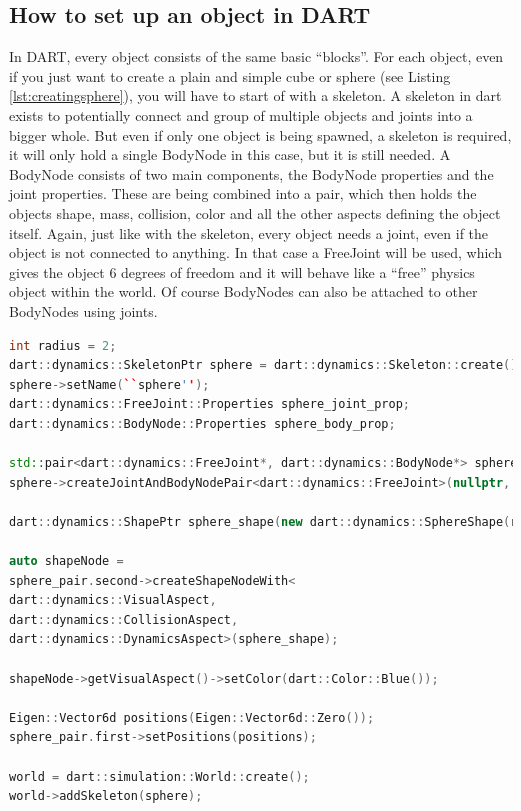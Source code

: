 \documentclass[12pt,oneside,listof=totoc,paper=a4,headings=small]{scrbook}
\begin{document}
\subsection{How to set up an object in DART}
In DART, every object consists of the same basic ``blocks''. For each object, even if you just want to create a plain and simple cube or sphere (see Listing \ref{lst:creatingsphere}), you will have to start of with a skeleton. A skeleton in dart exists to potentially connect and group of multiple objects and joints into a bigger whole. But even if only one object is being spawned, a skeleton is required, it will only hold a single BodyNode in this case, but it is still needed. 
A BodyNode consists of two main components, the BodyNode properties and the joint properties. These are being combined into a pair, which then holds the objects shape, mass, collision, color and all the other aspects defining the object itself. Again, just like with the skeleton, every object needs a joint, even if the object is not connected to anything. In that case a FreeJoint will be used, which gives the object 6 degrees of freedom and it will behave like a ``free'' physics object within the world. 
Of course BodyNodes can also be attached to other BodyNodes using joints. 
\begin{lstlisting}[language=C++, label={lst:creatingsphere}, caption=Creating sphere in DART]
int radius = 2;
dart::dynamics::SkeletonPtr sphere = dart::dynamics::Skeleton::create();
sphere->setName(``sphere'');
dart::dynamics::FreeJoint::Properties sphere_joint_prop; 
dart::dynamics::BodyNode::Properties sphere_body_prop; 

std::pair<dart::dynamics::FreeJoint*, dart::dynamics::BodyNode*> sphere_pair =
sphere->createJointAndBodyNodePair<dart::dynamics::FreeJoint>(nullptr, sphere_joint_prop, sphere_body_prop);

dart::dynamics::ShapePtr sphere_shape(new dart::dynamics::SphereShape(radius));

auto shapeNode =
sphere_pair.second->createShapeNodeWith<
dart::dynamics::VisualAspect, 
dart::dynamics::CollisionAspect,
dart::dynamics::DynamicsAspect>(sphere_shape);

shapeNode->getVisualAspect()->setColor(dart::Color::Blue());

Eigen::Vector6d positions(Eigen::Vector6d::Zero());
sphere_pair.first->setPositions(positions);

world = dart::simulation::World::create();
world->addSkeleton(sphere);
\end{lstlisting}
\end{document}
